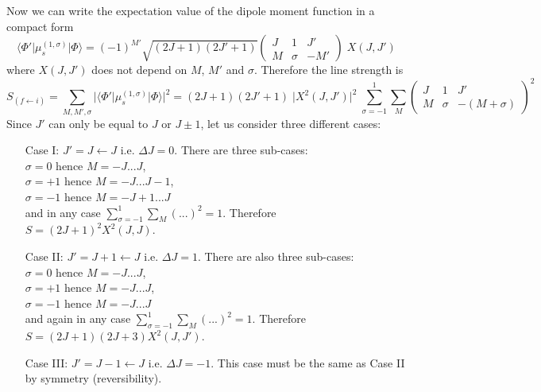 Now we can write the expectation value of the dipole moment function in a compact form
\begin{equation}
\langle \Phi' \vert \mu^{(1,\sigma)}_s \vert \Phi \rangle = 
(-1)^{M'} \sqrt{(2 J+1)(2 J'+1)} 
\left( \begin{array}{ccc} 
 J &      1 &  J' \\
 M & \sigma & -M'  \end{array} \right) \; X(J,J')
\end{equation}
where $X(J,J')$ does not depend on $M$, $M'$ and $\sigma$. Therefore the line strength is
\begin{equation}
S_{(f \leftarrow i)} = \sum_{M,M',\sigma} \vert \langle \Phi' \vert \mu^{(1,\sigma)}_s \vert \Phi \rangle \vert^2 = 
(2 J+1)(2 J'+1) \; 
\vert X^2(J,J') \vert^2 \; 
\sum^{1}_{\sigma = -1} \sum_{M}
\left( \begin{array}{ccc} 
 J &      1 &  J' \\
 M & \sigma & -(M+\sigma)  \end{array} \right)^2
\end{equation}
Since $J'$ can only be equal to $J$ or $J\pm 1$, let us consider three different cases: 
\begin{itemize}
\item[Case I:] $J' = J \leftarrow J$ i.e. $\Delta J = 0$. There are three sub-cases:\\
$\sigma = 0$ hence $M = -J ... J$, \\
$\sigma = +1$ hence $M = -J ... J-1$, \\
$\sigma = -1$ hence $M = -J+1 ... J$ \\
and in any case $\sum^{1}_{\sigma = -1} \sum_{M} (...)^2 = 1$. Therefore $S = (2J+1)^2 X^2(J,J)$.
\item[Case II:] $J' = J+1 \leftarrow J$ i.e. $\Delta J = 1$. There are also three sub-cases:\\
$\sigma = 0$ hence $M = -J ... J$, \\
$\sigma = +1$ hence $M = -J ... J$, \\
$\sigma = -1$ hence $M = -J ... J$ \\
and again in any case $\sum^{1}_{\sigma = -1} \sum_{M} (...)^2 = 1$. Therefore $S = (2J+1)(2J+3) X^2(J,J')$.
\item[Case III:] $J' = J-1 \leftarrow J$ i.e. $\Delta J = -1$. This case must be the same as Case II by symmetry (reversibility).
\end{itemize}

